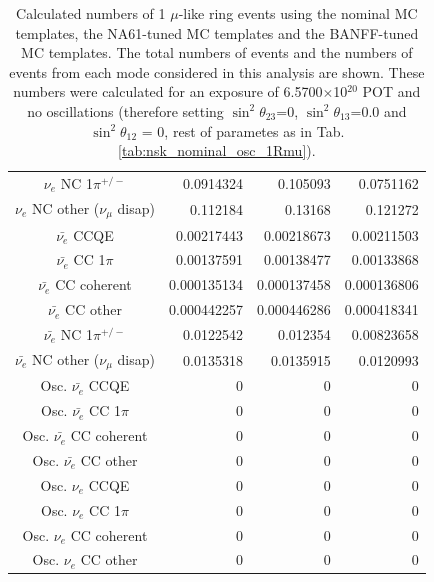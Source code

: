 \begin{table}
\begin{tabular}{| c |  D{.}{.}{-1} |  D{.}{.}{-1} |  D{.}{.}{-1} | }
$\nu_e$ NC 1$\pi^{+/-}$ & 0.0914324 & 0.105093 & 0.0751162 \\ 
$\nu_e$ NC other ($\nu_\mu$ disap) & 0.112184 & 0.13168 & 0.121272 \\ 
$\bar{\nu_e}$ CCQE & 0.00217443 & 0.00218673 & 0.00211503 \\ 
$\bar{\nu_e}$ CC 1$\pi$ & 0.00137591 & 0.00138477 & 0.00133868 \\ 
$\bar{\nu_e}$ CC coherent & 0.000135134 & 0.000137458 & 0.000136806 \\ 
$\bar{\nu_e}$ CC other & 0.000442257 & 0.000446286 & 0.000418341 \\ 
$\bar{\nu_e}$ NC 1$\pi^{+/-}$ & 0.0122542 & 0.012354 & 0.00823658 \\ 
$\bar{\nu_e}$ NC other ($\nu_\mu$ disap) & 0.0135318 & 0.0135915 & 0.0120993 \\ 
Osc. $\bar{\nu_e}$ CCQE & 0 & 0 & 0 \\ 
Osc. $\bar{\nu_e}$ CC 1$\pi$ & 0 & 0 & 0 \\ 
Osc. $\bar{\nu_e}$ CC coherent & 0 & 0 & 0 \\ 
Osc. $\bar{\nu_e}$ CC other & 0 & 0 & 0 \\ 
Osc. $\nu_e$ CCQE & 0 & 0 & 0 \\ 
Osc. $\nu_e$ CC 1$\pi$ & 0 & 0 & 0 \\ 
Osc. $\nu_e$ CC coherent & 0 & 0 & 0 \\ 
Osc. $\nu_e$ CC other & 0 & 0 & 0 \\ 
\hline
\end{tabular}
\caption{
Calculated numbers of 1 $\mu$-like ring events using the nominal MC templates, the NA61-tuned MC templates
and the BANFF-tuned MC templates.
The total numbers of events and the numbers of events from each mode considered in this analysis are shown.
These numbers were calculated for an exposure of 6.5700$\times$10$^{20}$ POT
and  no oscillations (therefore setting $\sin^{2}\theta_{23}$=0,
$\sin^{2}\theta_{13}$=0.0 and $\sin^{2}\theta_{12}$ = 0, rest of parametes as in Tab. \ref{tab:nsk_nominal_osc_1Rmu}).
}
\label{tab:nsk_nominal_no_osc_1Rmu}
\end{table}
